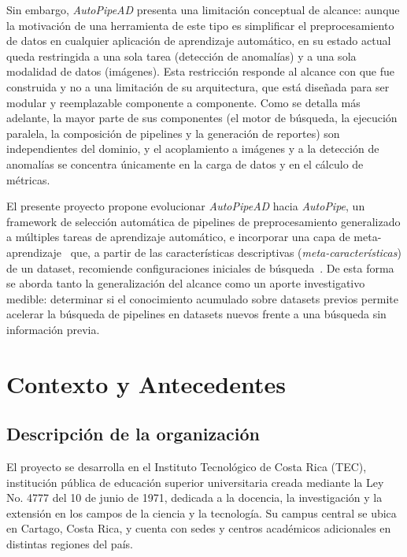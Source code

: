 \documentclass[12pt,letterpaper]{article}
\begin{document}
Sin embargo, \textit{AutoPipeAD} presenta una limitación conceptual de alcance: aunque la motivación de una herramienta de este tipo es simplificar el preprocesamiento de datos en cualquier aplicación de aprendizaje automático, en su estado actual queda restringida a una sola tarea (detección de anomalías) y a una sola modalidad de datos (imágenes). Esta restricción responde al alcance con que fue construida y no a una limitación de su arquitectura, que está diseñada para ser modular y reemplazable componente a componente. Como se detalla más adelante, la mayor parte de sus componentes (el motor de búsqueda, la ejecución paralela, la composición de pipelines y la generación de reportes) son independientes del dominio, y el acoplamiento a imágenes y a la detección de anomalías se concentra únicamente en la carga de datos y en el cálculo de métricas.

El presente proyecto propone evolucionar \textit{AutoPipeAD} hacia \textit{AutoPipe}, un framework de selección automática de pipelines de preprocesamiento generalizado a múltiples tareas de aprendizaje automático, e incorporar una capa de meta-aprendizaje~\cite{vanschoren2018metalearning, brazdil2009metalearning} que, a partir de las características descriptivas (\textit{meta-características}) de un dataset, recomiende configuraciones iniciales de búsqueda~\cite{feurer2015warmstart}. De esta forma se aborda tanto la generalización del alcance como un aporte investigativo medible: determinar si el conocimiento acumulado sobre datasets previos permite acelerar la búsqueda de pipelines en datasets nuevos frente a una búsqueda sin información previa.

\section{Contexto y Antecedentes}

\subsection{Descripción de la organización}

El proyecto se desarrolla en el Instituto Tecnológico de Costa Rica (TEC), institución pública de educación superior universitaria creada mediante la Ley No. 4777 del 10 de junio de 1971, dedicada a la docencia, la investigación y la extensión en los campos de la ciencia y la tecnología. Su campus central se ubica en Cartago, Costa Rica, y cuenta con sedes y centros académicos adicionales en distintas regiones del país.
\end{document}

